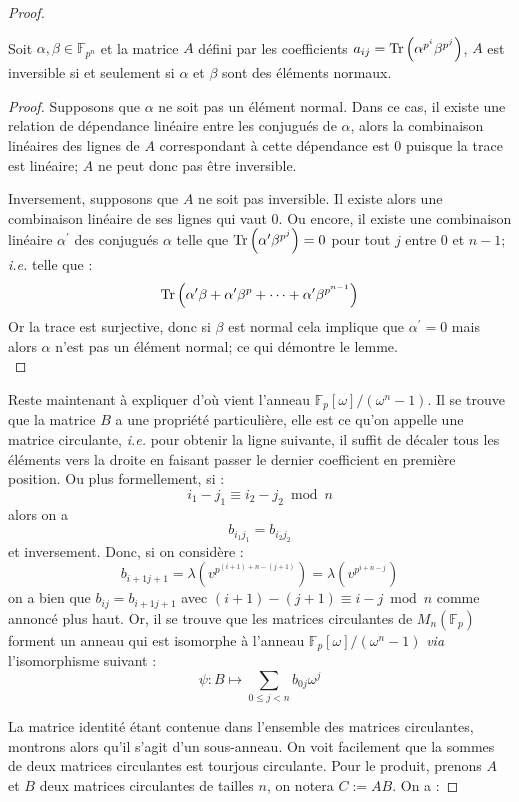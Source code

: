 \documentclass[a4paper]{article} %
\numberwithin{equation}{section}
\newcommand\GF[1]{\mathbb{F}_{#1}}
\newcommand\Tr[1]{\textup{Tr}\left(#1\right)}
\begin{document}
\begin{proof}
\begin{lem}%
Soit $\alpha,\beta\in\GF{p^n}$ et la matrice $A$ défini par les coefficients $a_{ij} = \Tr{\alpha^{p^i}\beta^{p^j}}$, $A$ est inversible si et seulement si $\alpha$ et $\beta$ sont des éléments normaux.
\end{lem}
\begin{proof}
Supposons que $\alpha$ ne soit pas un élément normal. Dans ce cas, il existe une relation de dépendance linéaire entre les conjugués de $\alpha$, alors la combinaison linéaires des lignes de $A$ correspondant à cette dépendance est $0$ puisque la trace est linéaire; $A$ ne peut donc pas être inversible.\par
Inversement, supposons que $A$ ne soit pas inversible. Il existe alors une combinaison linéaire de ses lignes qui vaut $0$. Ou encore, il existe une combinaison linéaire $\alpha^{\prime}$ des conjugués $\alpha$ telle que $\Tr{\alpha^{\prime}\beta^{p^j}} = 0$ pour tout $j$ entre $0$ et $n-1$; \textit{i.e.} telle que :
\[\Tr{\alpha^{\prime}\beta + \alpha^{\prime}\beta^p + \dots + \alpha^{\prime}\beta^{p^{n-1}}}\]
Or la trace est surjective, donc si $\beta$ est normal cela implique que $\alpha^{\prime} = 0$ mais alors $\alpha$ n'est pas un élément normal; ce qui démontre le lemme.\\
\end{proof}
Reste maintenant à expliquer d'où vient l'anneau $\mathbb{F}_p[\omega]/(\omega^n - 1)$. Il se trouve que la matrice $B$ a une propriété particulière, elle est ce qu'on appelle une matrice circulante, \textit{i.e.} pour obtenir la ligne suivante, il suffit de décaler tous les éléments vers la droite en faisant passer le dernier coefficient en première position. Ou plus formellement, si :
\[i_1 - j_1 \equiv i_2 - j_2 \bmod n\]
alors on a 
\[b_{i_1j_1} = b_{i_2j_2}\]
et inversement. Donc, si on considère :
\[b_{i+1j+1} = \lambda\left(v^{p^{(i+1) + n - (j+1)}}\right) = \lambda\left(v^{p^{i+n-j}}\right)\]
on a bien que $b_{ij} = b_{i+1j+1}$ avec $(i+1) - (j+1) \equiv i - j \bmod n$ comme annoncé plus haut. Or, il se trouve que les matrices circulantes de $M_n(\GF{p})$ forment un anneau qui est isomorphe à l'anneau $\mathbb{F}_p[\omega]/(\omega^n - 1)$ \textit{via} l'isomorphisme suivant :
\begin{equation*}
\label{isomconvert}
\psi : B \longmapsto \sum_{0\leq j < n}{b_{0j}\omega^j}
\end{equation*}\par
La matrice identité étant contenue dans l'ensemble des matrices circulantes, montrons alors qu'il s'agit d'un sous-anneau. On voit facilement que la sommes de deux matrices circulantes est tourjous circulante. Pour le produit, prenons $A$ et $B$ deux matrices circulantes de tailles $n$, on notera $C := AB$. On a :

\end{proof}
\end{document}
